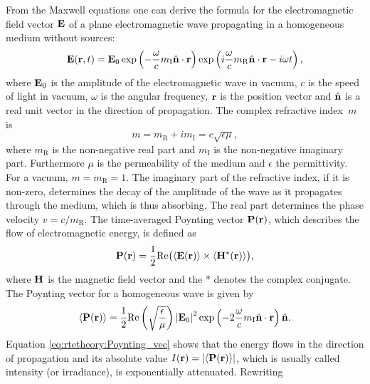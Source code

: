  From the Maxwell equations one can derive the formula for the
electromagnetic field vector $\mathbf{E}$ of a plane electromagnetic
wave propagating in a homogeneous medium without sources:
\begin{equation}
  \mathbf{E}(\mathbf{r}, t) =
  \mathbf{E}_0
  \exp\left(-\frac{\omega}{c} m_{\mathrm{I}} \hat{{\bf n}} \cdot \mathbf{r}\right)
  \exp\left(i \frac{\omega}{c} m_{\mathrm{R}} \hat{{\bf n}} \cdot \mathbf{r}  - i \omega t \right),
\end{equation}
where $\mathbf{E}_0$ is the amplitude of the electromagnetic wave in
vacuum, $c$ is the speed of light in vacuum, $\omega$ is the angular
frequency, $\mathbf{r}$ is the position vector and $\hat{{\bf n}}$
is a real unit vector in the direction of propagation. The complex
refractive index~$m$ is
\begin{equation}
  m = m_{\mathrm{R}}+ i m_{\mathrm{I}} = c \sqrt{\epsilon \mu},
\end{equation}
where $m_{\mathrm{R}}$ is the non-negative real part and $m_{\mathrm{I}}$ is the non-negative imaginary part. Furthermore $\mu$ is the
permeability of the medium and $\epsilon$ the permittivity.  For a
vacuum, $m = m_{\mathrm{R}} = 1$.  The imaginary part of the refractive
index, if it is non-zero, determines the decay of the amplitude of the
wave as it propagates through the medium, which is thus absorbing.
The real part determines the phase velocity $v = c/m_{\mathrm{R}}$.
The time-averaged Poynting vector $\mathbf{P}(\mathbf{r})$, which describes the
flow of electromagnetic energy, is defined as
\begin{equation}
   \mathbf{P}(\mathbf{r}) =
     \frac{1}{2} \mathrm{Re} \bigl(\left\langle \mathbf{E}(\mathbf{r}) \right\rangle \times
     \left\langle \mathbf{H}^*(\mathbf{r}) \right\rangle\bigr),
\end{equation}
where $\mathbf{H}$ is the magnetic field vector and the $*$ denotes the
complex conjugate. The Poynting vector for a homogeneous wave is given
by
\begin{equation}
\label{eq:rtetheory:Poynting_vec}
  \left\langle \mathbf{P}(\mathbf{r}) \right\rangle =
   \frac{1}{2}\mathrm{Re} \left( \sqrt{\frac{\epsilon}{\mu}} \right)
   \left| \mathbf{E}_0 \right| ^2
   \exp\left(-2\frac{\omega}{c} m_{\mathrm{I}} \hat{{\bf n}} \cdot
     \mathbf{r}\right) \hat{{\bf n}}.
\end{equation}
Equation \ref{eq:rtetheory:Poynting_vec} shows that the energy flows in the
direction of propagation and its absolute value $I(\mathbf{r}) =
\left| \left\langle \mathbf{P}(\mathbf{r}) \right\rangle \right| $, which is usually called
intensity (or irradiance), is exponentially attenuated. Rewriting

